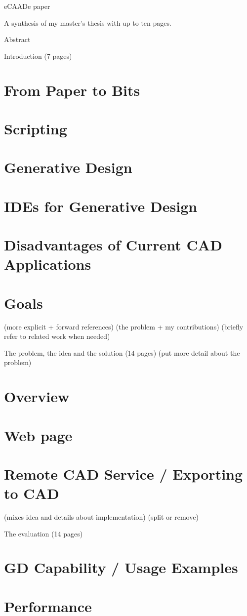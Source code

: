 
eCAADe paper

A synthesis of my master's thesis with up to ten pages.

Abstract


Introduction (7 pages)
\section{From Paper to Bits}
\section{Scripting}
\section{Generative Design}
\section{IDEs for Generative Design}
\section{Disadvantages of Current CAD Applications}
\section{Goals} (more explicit + forward references)
(the problem + my contributions) (briefly refer to related work when needed)


The problem, the idea and the solution (14 pages)
(put more detail about the problem)
\section{Overview}
\section{Web page}
\section{Remote CAD Service / Exporting to CAD}
(mixes idea and details about implementation) (split or remove)


The evaluation (14 pages)
\section{GD Capability / Usage Examples}
\section{Performance}


